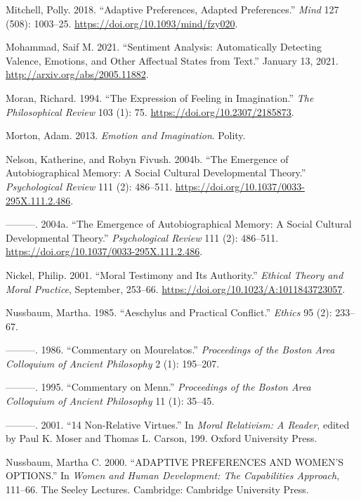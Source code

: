 \documentclass[12pt]{book}
\newenvironment{CSLReferences}%
  {\setlength{\parindent}{0pt}%
   \setlength{\leftskip}{0pt}%
   \setlength{\parskip}{0pt}}%
  {\par}
\theoremstyle{definition}
\theoremstyle{remark}
\begin{document}
\begin{CSLReferences}{1}{0}
Mitchell, Polly. 2018. {``Adaptive {Preferences}, {Adapted Preferences}.''} \emph{Mind} 127 (508): 1003--25. \url{https://doi.org/10.1093/mind/fzy020}.

Mohammad, Saif M. 2021. {``Sentiment {Analysis}: {Automatically Detecting Valence}, {Emotions}, and {Other Affectual States} from {Text}.''} January 13, 2021. \url{http://arxiv.org/abs/2005.11882}.

Moran, Richard. 1994. {``The {Expression} of {Feeling} in {Imagination}.''} \emph{The Philosophical Review} 103 (1): 75. \url{https://doi.org/10.2307/2185873}.

Morton, Adam. 2013. \emph{Emotion and {Imagination}}. Polity.

Nelson, Katherine, and Robyn Fivush. 2004b. {``The {Emergence} of {Autobiographical Memory}: {A Social Cultural Developmental Theory}.''} \emph{Psychological Review} 111 (2): 486--511. \url{https://doi.org/10.1037/0033-295X.111.2.486}.

---------. 2004a. {``The {Emergence} of {Autobiographical Memory}: {A Social Cultural Developmental Theory}.''} \emph{Psychological Review} 111 (2): 486--511. \url{https://doi.org/10.1037/0033-295X.111.2.486}.

Nickel, Philip. 2001. {``Moral {Testimony} and Its {Authority}.''} \emph{Ethical Theory and Moral Practice}, September, 253--66. \url{https://doi.org/10.1023/A:1011843723057}.

Nussbaum, Martha. 1985. {``Aeschylus and Practical Conflict.''} \emph{Ethics} 95 (2): 233--67.

---------. 1986. {``Commentary on {Mourelatos}.''} \emph{Proceedings of the Boston Area Colloquium of Ancient Philosophy} 2 (1): 195--207.

---------. 1995. {``Commentary on {Menn}.''} \emph{Proceedings of the Boston Area Colloquium of Ancient Philosophy} 11 (1): 35--45.

---------. 2001. {``14 {Non-Relative Virtues}.''} In \emph{Moral {Relativism}: {A Reader}}, edited by Paul K. Moser and Thomas L. Carson, 199. Oxford University Press.

Nussbaum, Martha C. 2000. {``{ADAPTIVE PREFERENCES AND WOMEN}'{S OPTIONS}.''} In \emph{Women and Human Development: {The} Capabilities Approach}, 111--66. The Seeley Lectures. Cambridge: Cambridge University Press.


\end{CSLReferences}
\end{document}
